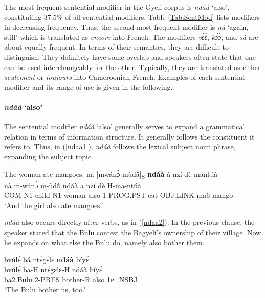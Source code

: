 The most frequent sentential modifier in the Gyeli corpus is {\itshape ndáà} `also', constituting 37.5\% of all sentential modifiers. Table \ref{Tab:SentMod} lists modifiers in decreasing frequency. Thus, the second most frequent modifier is {\itshape ná} `again, still' which is translated as {\itshape encore} into French. The modifiers {\itshape vɛ̀ɛ̀}, {\itshape kɔ́ɔ̀}, and {\itshape sâ} are about equally frequent. In terms of their semantics, they are difficult to distinguish. They definitely have some overlap and speakers often state that one can be used interchangeably for the other. Typically, they are translated as either {\itshape seulement} or {\itshape toujours} into Cameroonian French.
Examples of each sentential modifier and its range of use is given in the following.


\paragraph{{\itshape ndáà} `also'} The sentential modifier {\itshape ndáà} `also' generally serves to expand a grammatical relation in terms of information structure. It generally follows the constituent it refers to. Thus, in (\ref{ndaa1}), {\itshape ndáà} follows the lexical subject noun phrase, expanding the subject topic. 

\begin{exe} 
\ex\label{ndaa1} The woman ate mangoes.
   \glll nà [mwánɔ̀ mùdã̂]\textsubscript{S} {\bfseries ndáà} à nzí dè mántúà \\
      nà m-wánɔ̀ m-ùdã̂ ndáà a nzí dè H-ma-ntúà \\
       COM N1-child N1-woman also 1 PROG.PST eat OBJ.LINK-ma6-mango  \\
    \trans `And the girl also ate mangoes.'
\end{exe}

{\itshape ndáà} also occurs directly after verbs, as in (\ref{ndaa2}). In the previous clause, the speaker stated that the Bulu contest the Bagyeli's ownership of their village. Now he expands on what else the Bulu do, namely also bother them.

\begin{exe} 
\ex\label{ndaa2} 
  \glll bvúlɛ̀ bá ntɛ́gɛ́lɛ́ {\bfseries ndáà} bíyɛ̀ \\
       bvúlɛ̀ ba-H ntɛ́gɛlɛ-H ndáà bíyɛ̀ \\
         ba2.Bulu 2-PRES bother-R also 1\textsc{pl}.NSBJ   \\
    \trans `The Bulu bother us, too.'
\end{exe}

